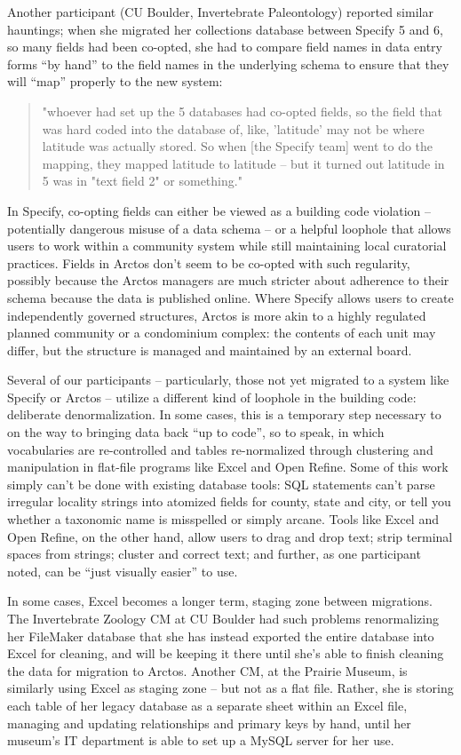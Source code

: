 Another participant (CU Boulder, Invertebrate Paleontology) reported similar hauntings; when she migrated her collections database between Specify 5 and 6, so many fields had been co-opted, she had to compare field names in data entry forms “by hand” to the field names in the underlying schema to ensure that they will “map” properly to the new system: 
\begin{quote}
"whoever had set up the 5 databases had co-opted fields, so the field that was hard coded into the database of, like, 'latitude' may not be where latitude was actually stored. So when [the Specify team] went to do the mapping, they mapped latitude to latitude -- but it turned out latitude in 5 was in "text field 2" or something." 
\end{quote}

In Specify, co-opting fields can either be viewed as a building code violation -- potentially dangerous misuse of a data schema -- or a helpful loophole that allows users to work within a community system while still maintaining local curatorial practices. Fields in Arctos don't seem to be co-opted with such regularity, possibly because the Arctos managers are much stricter about adherence to their schema because the data is published online. Where Specify allows users to create independently governed structures, Arctos is more akin to a highly regulated planned community or a condominium complex: the contents of each unit may differ, but the structure is managed and maintained by an external board.

Several of our participants -- particularly, those not yet migrated to a system like Specify or Arctos -- utilize a different kind of loophole in the building code: deliberate denormalization. In some cases, this is a temporary step necessary to on the way to bringing data back “up to code”, so to speak, in which vocabularies are re-controlled and tables re-normalized through clustering and manipulation in flat-file programs like Excel and Open Refine. Some of this work simply can’t be done with existing database tools: SQL statements can’t parse irregular locality strings into atomized fields for county, state and city, or tell you whether a taxonomic name is misspelled or simply arcane. Tools like Excel and Open Refine, on the other hand, allow users to drag and drop text; strip terminal spaces from strings; cluster and correct text; and further, as one participant noted, can be “just visually easier” to use. 

In some cases, Excel becomes a longer term, staging zone between migrations. The Invertebrate Zoology CM at CU Boulder had such problems renormalizing her FileMaker database that she has instead exported the entire database into Excel for cleaning, and will be keeping it there until she’s able to finish cleaning the data for migration to Arctos. Another CM, at the Prairie Museum, is similarly using Excel as staging zone – but not as a flat file.  Rather, she is storing each table of her legacy database as a separate sheet within an Excel file, managing and updating relationships and primary keys by hand, until her museum’s IT department is able to set up a MySQL server for her use.

